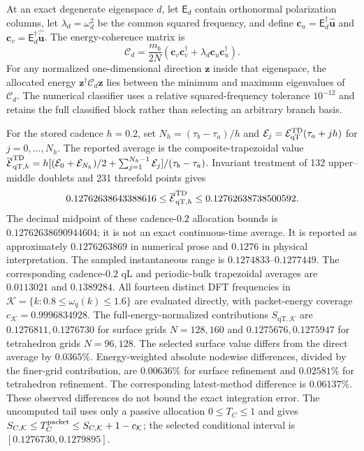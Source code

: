\documentclass[10pt,aps,pre,onecolumn,notitlepage,nofootinbib]{revtex4-2}
\newcommand{\qT}{\mathrm{qT}}
\begin{document}
At an exact degenerate eigenspace $d$, let $\mathsf E_d$ contain orthonormal polarization columns, let $\lambda_d=\omega_d^2$ be the common squared frequency, and define $\bm c_u=\mathsf E_d^\dagger\widehat{\bm u}$ and $\bm c_v=\mathsf E_d^\dagger\widehat{\dot{\bm u}}$. The energy-coherence matrix is
\begin{equation}
 \mathcal C_d=\frac{m_b}{2N}
 \left(\bm c_v\bm c_v^\dagger+\lambda_d\bm c_u\bm c_u^\dagger\right).
\end{equation}
For any normalized one-dimensional direction $\bm z$ inside that eigenspace, the allocated energy $\bm z^\dagger\mathcal C_d\bm z$ lies between the minimum and maximum eigenvalues of $\mathcal C_d$. The numerical classifier uses a relative squared-frequency tolerance $10^{-12}$ and retains the full classified block rather than selecting an arbitrary branch basis.

For the stored cadence $h=0.2$, set $N_h=(\tau_b-\tau_a)/h$ and $\mathcal E_j=\mathcal E_{\qT}^{\rm TD}(\tau_a+jh)$ for $j=0,\ldots,N_h$. The reported average is the composite-trapezoidal value $\overline{\mathcal E}_{\qT,h}^{\rm TD}=h[(\mathcal E_0+\mathcal E_{N_h})/2+\sum_{j=1}^{N_h-1}\mathcal E_j]/(\tau_b-\tau_a)$. Invariant treatment of 132 upper--middle doublets and 231 threefold points gives
\begin{equation}
 0.12762638643388616\le\overline{\mathcal E}_{\qT,h}^{\rm TD}
 \le0.12762638738500592.
\end{equation}
The decimal midpoint of these cadence-$0.2$ allocation bounds is $0.12762638690944604$; it is not an exact continuous-time average. It is reported as approximately $0.1276263869$ in numerical prose and $0.1276$ in physical interpretation. The sampled instantaneous range is $0.1274833$--$0.1277449$. The corresponding cadence-$0.2$ qL and periodic-bulk trapezoidal averages are $0.0113021$ and $0.1389284$. All fourteen distinct DFT frequencies in $\mathcal K=\{k:0.8\le\omega_q(k)\le1.6\}$ are evaluated directly, with packet-energy coverage $c_{\mathcal K}=0.9996834928$. The full-energy-normalized contributions $S_{\qT,\mathcal K}$ are $0.1276811,0.1276730$ for surface grids $N=128,160$ and $0.1275676,0.1275947$ for tetrahedron grids $N=96,128$. The selected surface value differs from the direct average by $0.0365\%$. Energy-weighted absolute nodewise differences, divided by the finer-grid contribution, are $0.00636\%$ for surface refinement and $0.02581\%$ for tetrahedron refinement. The corresponding latest-method difference is $0.06137\%$. These observed differences do not bound the exact integration error. The uncomputed tail uses only a passive allocation $0\le T_C\le1$ and gives $S_{C,\mathcal K}\le T_C^{\rm packet}\le S_{C,\mathcal K}+1-c_{\mathcal K}$; the selected conditional interval is $[0.1276730,0.1279895]$.
\end{document}
